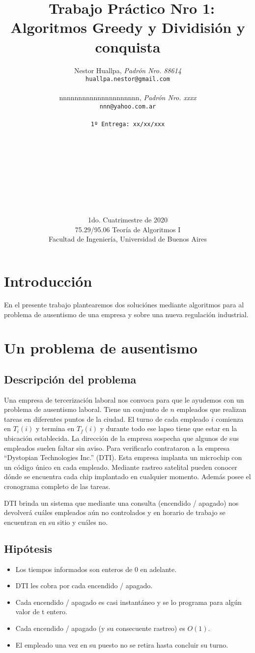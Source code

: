 \documentclass{article}
\title{	\ Trabajo Práctico Nro 1: Algoritmos Greedy y Dividisión y conquista}
\author{    Nestor Huallpa, \textit{Padrón Nro. 88614}\\
            \texttt{ huallpa.nestor@gmail.com }\\\\  
            nnnnnnnnnnnnnnnnnnnnn, \textit{Padrón Nro. xxxx}\\
            \texttt{ nnn@yahoo.com.ar }\\\\              
            \texttt{\footnotesize 1º Entrega: xx/xx/xxx}\\
            \\\\\\\\\\\\\\\\\\
            \normalsize{1do. Cuatrimestre de 2020}\\ 
            \normalsize{75.29/95.06 Teoría de Algoritmos I} \\
            \normalsize{Facultad de Ingeniería, Universidad de Buenos Aires} \\}
\date{}
\begin{document}
\maketitle
\thispagestyle{empty}

\newpage{}
\tableofcontents

\thispagestyle{empty}

\newpage{}

\newpage
\section{Introducción}

En el presente trabajo plantearemos dos soluciónes mediante algoritmos para al problema de ausentismo de una empresa y sobre una nueva regulación industrial. 

\section{Un problema de ausentismo}

\subsection{Descripción del problema}

Una empresa de tercerización laboral nos convoca para que le ayudemos con un problema de ausentismo laboral. 
Tiene un conjunto de \(n\) empleados que realizan tareas en diferentes puntos de la ciudad. 
El turno de cada empleado \(i\) comienza en \(T_i(i)\) y termina en \(T_f(i)\) y durante todo ese lapso tiene que estar en la ubicación establecida. 
La dirección de la empresa sospecha que algunos de sus empleados suelen faltar sin aviso. Para verificarlo contrataron a la empresa “Dystopian Technologies Inc.” (DTI). 
Esta empresa implanta un microchip con un código único en cada empleado. Mediante rastreo satelital pueden conocer dónde se encuentra cada chip implantado en cualquier momento. Además posee el cronograma completo de las tareas.

DTI brinda un sistema que mediante una consulta (encendido / apagado) nos devolverá cuáles empleados aún no controlados y en horario de trabajo se encuentran en su sitio y cuáles no.
\subsection{Hipótesis}
\begin{itemize}
    \item Los tiempos informados son enteros de 0 en adelante.
    \item DTI les cobra por cada encendido / apagado.
    \item Cada encendido / apagado es casi instantáneo y se lo programa para algún valor de t entero.
    \item Cada encendido / apagado (y su consecuente rastreo) es \(O(1)\).
    \item El empleado una vez en su puesto no se retira hasta concluir su turno.
\end{itemize}
\end{document}
